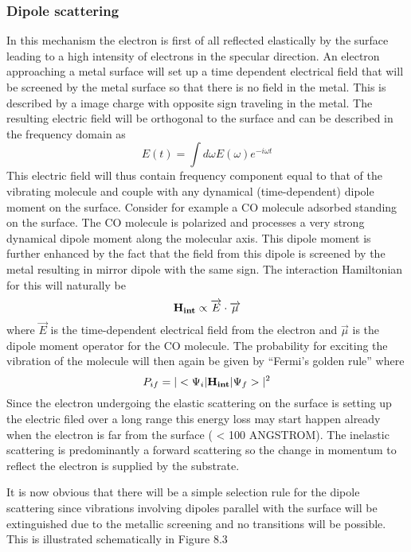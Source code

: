 \subsubsection{Dipole scattering}
In this mechanism the electron is first of all reflected elastically by the surface leading to a high intensity of electrons in the specular direction. An electron approaching a metal surface will set up a time dependent  electrical field that will be screened by the metal surface so that  there is no field in the metal. This is described by a image charge with opposite sign traveling in the metal. The resulting electric field will be orthogonal to the surface and can be described in the frequency domain as 
\begin{equation}
E(t) = \int d\omega E(\omega)e^{-i\omega t}
\end{equation}
This electric field will thus contain frequency component equal to that of the vibrating molecule and  couple with any dynamical (time-dependent) dipole moment on the surface. Consider for example a CO molecule adsorbed standing on the surface. The  CO molecule is polarized and processes a very strong dynamical  dipole moment along the molecular axis. This dipole moment is further enhanced by the fact that the field from this dipole is screened by the metal resulting in mirror dipole with the same sign. The interaction Hamiltonian for this will naturally be
\begin{equation}
 {\bf H_{int}} \propto  \overrightarrow{E} \cdot \overrightarrow{\mu}
\end{equation} 
where $\overrightarrow{E}$  is the time-dependent electrical field from the electron and $\overrightarrow{\mu}$ is the  dipole moment operator for  the CO molecule. The probability for exciting the vibration of the molecule will then again be given by ``Fermi's golden rule'' where
\begin{equation}
P_{if}=|<\Psi_{i}|{\bf H_{int}}|\Psi_{f}>|^2
\end{equation}
Since the electron undergoing the elastic scattering on the surface is setting up the electric filed over a long range this energy loss may start happen already when the electron is far from the surface ( < 100 ANGSTROM). The inelastic scattering is predominantly a forward scattering so the change in momentum to reflect the electron is supplied by the substrate.

It is now obvious that there will be  a simple selection rule for the dipole scattering since vibrations involving dipoles parallel with the surface will be extinguished due to the metallic screening and no transitions will be possible. This is illustrated schematically in Figure 8.3

